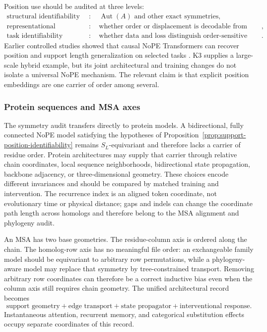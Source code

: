 \documentclass[10pt]{article}
\theoremstyle{definition}
\theoremstyle{remark}
\newcommand{\BookSubsection}[1]{\subsubsection{#1}}
\begin{document}
Position use should be audited at three levels:
\begin{equation}
\begin{aligned}
\text{structural identifiability}&:\quad \operatorname{Aut}(A)\text{ and other exact symmetries},\\
\text{representational observability}&:\quad \text{whether order or displacement is decodable from hidden state},\\
\text{task identifiability}&:\quad \text{whether data and loss distinguish order-sensitive alternatives}.
\end{aligned}
\label{eq:position-identifiability-levels}
\end{equation}
Earlier controlled studies showed that causal NoPE Transformers can recover position and
support length generalization on selected tasks \cite{haviv2022nope,kazemnejad2023positional}.
K3 supplies a large-scale hybrid example, but its joint architectural and training changes do
not isolate a universal NoPE mechanism.  The relevant claim is that explicit position embeddings
are one carrier of order among several.

\BookSubsection{Protein sequences and MSA axes}

The symmetry audit transfers directly to protein models.  A bidirectional, fully connected NoPE
model satisfying the hypotheses of Proposition~\ref{prop:support-position-identifiability} remains
$S_L$-equivariant and therefore lacks a carrier of residue order.  Protein architectures may supply that carrier through relative chain
coordinates, local sequence neighborhoods, bidirectional state propagation, backbone adjacency, or
three-dimensional geometry.  These choices encode different invariances and should be compared by
matched training and intervention.  The recurrence index is an aligned token coordinate, not
evolutionary time or physical distance; gaps and indels can change the coordinate path length across
homologs and therefore belong to the MSA alignment and phylogeny audit.

An MSA has two base geometries.  The residue-column axis is ordered along the chain.  The homolog-row
axis has no meaningful file order: an exchangeable family model should be equivariant to arbitrary
row permutations, while a phylogeny-aware model may replace that symmetry by tree-constrained
transport.  Removing arbitrary row coordinates can therefore be a correct inductive bias even when
the column axis still requires chain geometry.  The unified architectural record becomes
\begin{equation}
\boxed{
\text{support geometry}
+\text{edge transport}
+\text{state propagator}
+\text{interventional response}.}
\label{eq:position-state-response-record}
\end{equation}
Instantaneous attention, recurrent memory, and categorical substitution effects occupy separate
coordinates of this record.
\end{document}
